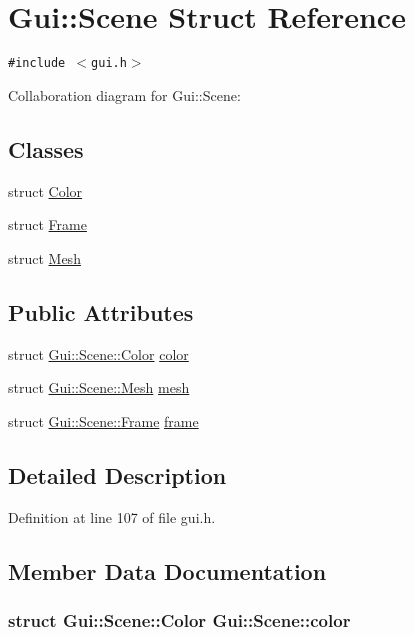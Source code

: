 \hypertarget{structGui_1_1Scene}{
\section{Gui::Scene Struct Reference}
\label{structGui_1_1Scene}
}
{\tt \#include $<$gui.h$>$}

Collaboration diagram for Gui::Scene:\subsection*{Classes}
\begin{CompactItemize}
\item 
struct \hyperlink{structGui_1_1Scene_1_1Color}{Color}
\item 
struct \hyperlink{structGui_1_1Scene_1_1Frame}{Frame}
\item 
struct \hyperlink{structGui_1_1Scene_1_1Mesh}{Mesh}
\end{CompactItemize}
\subsection*{Public Attributes}
\begin{CompactItemize}
\item 
struct \hyperlink{structGui_1_1Scene_1_1Color}{Gui::Scene::Color} \hyperlink{structGui_1_1Scene_c671aaf36698faf34e7298ff8f7751e4}{color}
\item 
struct \hyperlink{structGui_1_1Scene_1_1Mesh}{Gui::Scene::Mesh} \hyperlink{structGui_1_1Scene_a46c674ee6715e5bc6a86c6943300dab}{mesh}
\item 
struct \hyperlink{structGui_1_1Scene_1_1Frame}{Gui::Scene::Frame} \hyperlink{structGui_1_1Scene_bd3409093955b255885c611f39f5b0af}{frame}
\end{CompactItemize}


\subsection{Detailed Description}


Definition at line 107 of file gui.h.

\subsection{Member Data Documentation}
\hypertarget{structGui_1_1Scene_c671aaf36698faf34e7298ff8f7751e4}{
\subsubsection[{color}]{\setlength{\rightskip}{0pt plus 5cm}struct {\bf Gui::Scene::Color}	 {\bf Gui::Scene::color}}}
\label{structGui_1_1Scene_c671aaf36698faf34e7298ff8f7751e4}




